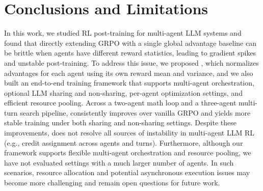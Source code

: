 \section{Conclusions and Limitations}
In this work, we studied RL post-training for multi-agent LLM systems and found that directly extending GRPO with a single global advantage baseline can be brittle when agents have different reward statistics, leading to gradient spikes and unstable post-training. To address this issue, we proposed \methodname{}, which normalizes advantages for each agent using its own reward mean and variance, and we also built an end-to-end training framework that supports multi-agent orchestration, optional LLM sharing and non-sharing, per-agent optimization settings, and efficient resource pooling. Across a two-agent math loop and a three-agent multi-turn search pipeline, \methodname{} consistently improves over vanilla GRPO and yields more stable training under both sharing and non-sharing settings. Despite these improvements, \methodname{} does not resolve all sources of instability in multi-agent LLM RL (e.g., credit assignment across agents and turns). Furthermore, although our framework supports flexible multi-agent orchestration and resource pooling, we have not evaluated settings with a much larger number of agents. In such scenarios, resource allocation and potential asynchronous execution issues may become more challenging and remain open questions for future work.
